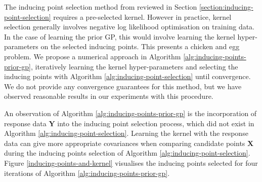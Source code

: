 \documentclass{article}
\numberwithin{equation}{section}
\begin{document}
The inducing point selection method from \cite{burt2020convergence} reviewed in Section \ref{section:inducing-point-selection} requires a pre-selected kernel.
However in practice, kernel selection generally involves negative log likelihood optimisation on training data.
In the case of learning the prior GP, this would involve learning the kernel hyper-parameters on the selected inducing points.
This presents a chicken and egg problem.
We propose a numerical approach in Algorithm \ref{alg:inducing-points-prior-gp}, iteratively learning the kernel hyper-parameters and selecting the inducing points with Algorithm \ref{alg:inducing-point-selection} until convergence.
We do not provide any convergence guarantees for this method, but we have observed reasonable results in our experiments with this procedure.

An observation of Algorithm \ref{alg:inducing-points-prior-gp} is the incorporation of response data $\mathbf{Y}$ into the inducing point selection process, which did not exist in Algorithm \ref{alg:inducing-point-selection}. Learning the kernel with the response data can give more appropriate covariances when comparing candidate points $\mathbf{X}$ during the inducing points selection of Algorithm \ref{alg:inducing-point-selection}. Figure \ref{inducing-points-and-kernel} visualises the inducing points selected for four iterations of Algorithm \ref{alg:inducing-points-prior-gp}.
\end{document}
